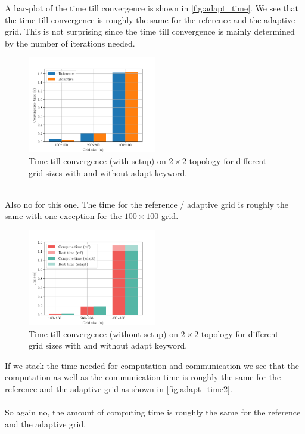 A bar-plot of the time till convergence is shown in \autoref{fig:adapt_time}. We see that the time till convergence is roughly the same for the reference and the adaptive grid. This is not surprising since the time till convergence is mainly determined by the number of iterations needed. 

\begin{figure}[H]
    \centering
    \includegraphics[width=0.5\textwidth]{../fig/lab2/adapt_time.png}
    \caption{Time till convergence (with setup) on $2\times2$ topology for different grid sizes with and without adapt keyword.}
    \label{fig:adapt_time}
\end{figure}
\\
Also no for this one. The time for the reference / adaptive grid is roughly the same with one exception for the $100\times100$ grid.\\
\begin{figure}[H]
    \centering
    \includegraphics[width=0.5\textwidth]{../fig/lab2/adapt_stacked_time.png}
    \caption{Time till convergence (without setup) on $2\times2$ topology for different grid sizes with and without adapt keyword.}
    \label{fig:adapt_time2}
\end{figure}
If we stack the time needed for computation and communication we see that the computation as well as the communication time is roughly the same for the reference and the adaptive grid as shown in \autoref{fig:adapt_time2}.\\

\\
So again no, the amount of computing time is roughly the same for the reference and the adaptive grid.\\

